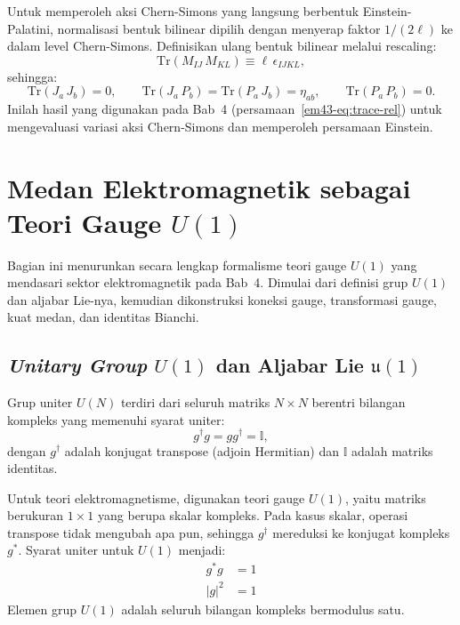 Untuk memperoleh aksi Chern-Simons yang langsung berbentuk Einstein-Palatini, normalisasi bentuk bilinear dipilih dengan menyerap faktor $1/(2\ell)$ ke dalam level Chern-Simons. Definisikan ulang bentuk bilinear melalui rescaling:
\begin{equation}\label{abf-eq:bilinear-rescaled}
    \mathrm{Tr}(M_{IJ}\,M_{KL}) \equiv \ell\,\epsilon_{IJKL},
\end{equation}
sehingga:
\begin{equation}\label{abf-eq:final-summary}
    \mathrm{Tr}(J_a\,J_b) = 0, \qquad \mathrm{Tr}(J_a\,P_b) = \mathrm{Tr}(P_a\,J_b) = \eta_{ab}, \qquad \mathrm{Tr}(P_a\,P_b) = 0.
\end{equation}
Inilah hasil yang digunakan pada Bab~4 (persamaan~\eqref{em43-eq:trace-rel}) untuk mengevaluasi variasi aksi Chern-Simons dan memperoleh persamaan Einstein.

\section{Medan Elektromagnetik sebagai Teori Gauge $U(1)$}
\label{app:u1-gauge}

Bagian ini menurunkan secara lengkap formalisme teori gauge $U(1)$ yang mendasari sektor elektromagnetik pada Bab~4. Dimulai dari definisi grup $U(1)$ dan aljabar Lie-nya, kemudian dikonstruksi koneksi gauge, transformasi gauge, kuat medan, dan identitas Bianchi.

\subsection{\textit{Unitary Group} $U(1)$ dan Aljabar Lie $\mathfrak{u}(1)$}

Grup uniter $U(N)$ terdiri dari seluruh matriks $N \times N$ berentri bilangan kompleks yang memenuhi syarat uniter:
\begin{equation}
  g^\dagger g=gg^\dagger=\mathbb{I},
\end{equation}
dengan $g^\dagger$ adalah konjugat transpose (adjoin Hermitian) dan $\mathbb{I}$ adalah matriks identitas.

Untuk teori elektromagnetisme, digunakan teori gauge $U(1)$, yaitu matriks berukuran $1 \times 1$ yang berupa skalar kompleks. Pada kasus skalar, operasi transpose tidak mengubah apa pun, sehingga $g^\dagger$ mereduksi ke konjugat kompleks $g^*$. Syarat uniter untuk $U(1)$ menjadi:
\begin{align}
  g^*g&=1 \nonumber \\
  |g|^2&=1 \label{em43-eq:syarat-uniter}
\end{align}
Elemen grup $U(1)$ adalah seluruh bilangan kompleks bermodulus satu.

